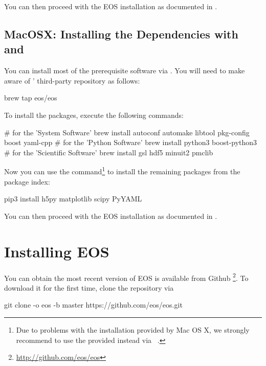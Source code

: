 You can then proceed with the EOS installation as documented in .

\subsection{MacOSX: Installing the Dependencies with  and }

You can install most of the prerequisite software via .
You will need to make  aware of \EOS'
third-party repository as follows:
\begin{commandline}
brew tap eos/eos
\end{commandline}

To install the packages, execute the following commands:
\begin{commandline}
# for the 'System Software'
brew install autoconf automake libtool pkg-config boost yaml-cpp
# for the 'Python Software'
brew install python3 boost-python3
# for the 'Scientific Software'
brew install gsl hdf5 minuit2 pmclib
\end{commandline}

Now you can use the  command\footnote{%
    Due to problems with the  installation provided by Mac OS
    X, we strongly recommend to use the  provided
     instead via ~.
}
to install the remaining packages from the  package index:
\begin{commandline}
pip3 install h5py matplotlib scipy PyYAML
\end{commandline}


You can then proceed with the EOS installation as documented in .

\section{Installing EOS}
\label{sec:inst:EOS}

You can obtain the most recent version of EOS is available from Github
\footnote{\url{http://github.com/eos/eos}}.  To download it for the first time,
clone the repository via
%
\begin{commandline}
git clone -o eos -b master https://github.com/eos/eos.git
\end{commandline}

